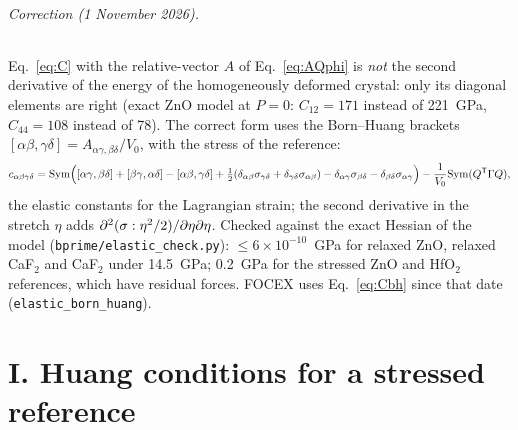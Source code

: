 \documentclass[11pt,a4paper]{article}
\newcommand{\al}{\alpha}\newcommand{\be}{\beta}\newcommand{\ga}{\gamma}\newcommand{\de}{\delta}
\begin{document}
\paragraph{Correction (1 November 2026).} Eq.~\eqref{eq:C} with the relative-vector $A$ of Eq.~\eqref{eq:AQphi}
is \emph{not} the second derivative of the energy of the homogeneously deformed crystal: only its diagonal
elements are right (exact ZnO model at $P=0$: $C_{12}=171$ instead of 221~GPa, $C_{44}=108$ instead of 78).
The correct form uses the Born--Huang brackets $[\al\be,\ga\de]=A_{\al\ga,\be\de}/V_0$, with the stress of the
reference:
\begin{equation}
c_{\al\be\ga\de}=\mathrm{Sym}\Big([\al\ga,\be\de]+[\be\ga,\al\de]-[\al\be,\ga\de]
+\tfrac12(\de_{\al\be}\si_{\ga\de}+\de_{\ga\de}\si_{\al\be})-\de_{\al\ga}\si_{\be\de}-\de_{\be\de}\si_{\al\ga}\Big)
-\frac1{V_0}\mathrm{Sym}(Q^{\mathsf T}\Ga Q),
\label{eq:Cbh}
\end{equation}
the elastic constants for the Lagrangian strain; the second derivative in the stretch $\eta$ adds
$\partial^2(\sigma:\eta^2/2)/\partial\eta\partial\eta$. Checked against the exact Hessian of the model
(\texttt{bprime/elastic\_check.py}): $\le6\times10^{-10}$~GPa for relaxed ZnO, relaxed CaF$_2$ and CaF$_2$
under 14.5~GPa; 0.2~GPa for the stressed ZnO and HfO$_2$ references, which have residual forces. FOCEX
uses Eq.~\eqref{eq:Cbh} since that date (\texttt{elastic\_born\_huang}).

\part*{I. Huang conditions for a stressed reference}
\end{document}
